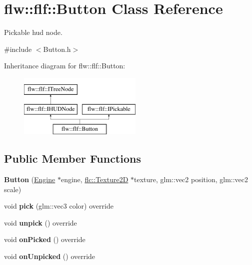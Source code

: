 \hypertarget{classflw_1_1flf_1_1Button}{}\section{flw\+:\+:flf\+:\+:Button Class Reference}
\label{classflw_1_1flf_1_1Button}


Pickable hud node.  




{\ttfamily \#include $<$Button.\+h$>$}

Inheritance diagram for flw\+:\+:flf\+:\+:Button\+:\begin{figure}[H]
\begin{center}
\leavevmode
\includegraphics[height=3.000000cm]{classflw_1_1flf_1_1Button}
\end{center}
\end{figure}
\subsection*{Public Member Functions}
\begin{DoxyCompactItemize}
\item 
{\bfseries Button} (\hyperlink{classflw_1_1Engine}{Engine} $\ast$engine, \hyperlink{classflw_1_1flc_1_1Texture2D}{flc\+::\+Texture2D} $\ast$texture, glm\+::vec2 position, glm\+::vec2 scale)\hypertarget{classflw_1_1flf_1_1Button_ad3ae337aac8f1db876ac67decefac587}{}\label{classflw_1_1flf_1_1Button_ad3ae337aac8f1db876ac67decefac587}

\item 
void {\bfseries pick} (glm\+::vec3 color) override\hypertarget{classflw_1_1flf_1_1Button_a719b2df023e75d1706adcb83327fb94f}{}\label{classflw_1_1flf_1_1Button_a719b2df023e75d1706adcb83327fb94f}

\item 
void {\bfseries unpick} () override\hypertarget{classflw_1_1flf_1_1Button_a70c6c0ad26ee8b953eaf7a4b8c477e42}{}\label{classflw_1_1flf_1_1Button_a70c6c0ad26ee8b953eaf7a4b8c477e42}

\item 
void {\bfseries on\+Picked} () override\hypertarget{classflw_1_1flf_1_1Button_a8ed9587ee4157b9b5c148f81e63b1a51}{}\label{classflw_1_1flf_1_1Button_a8ed9587ee4157b9b5c148f81e63b1a51}

\item 
void {\bfseries on\+Unpicked} () override\hypertarget{classflw_1_1flf_1_1Button_aaf3a95201ffbd05d132cacd70fddb0c5}{}\label{classflw_1_1flf_1_1Button_aaf3a95201ffbd05d132cacd70fddb0c5}

\end{DoxyCompactItemize}

